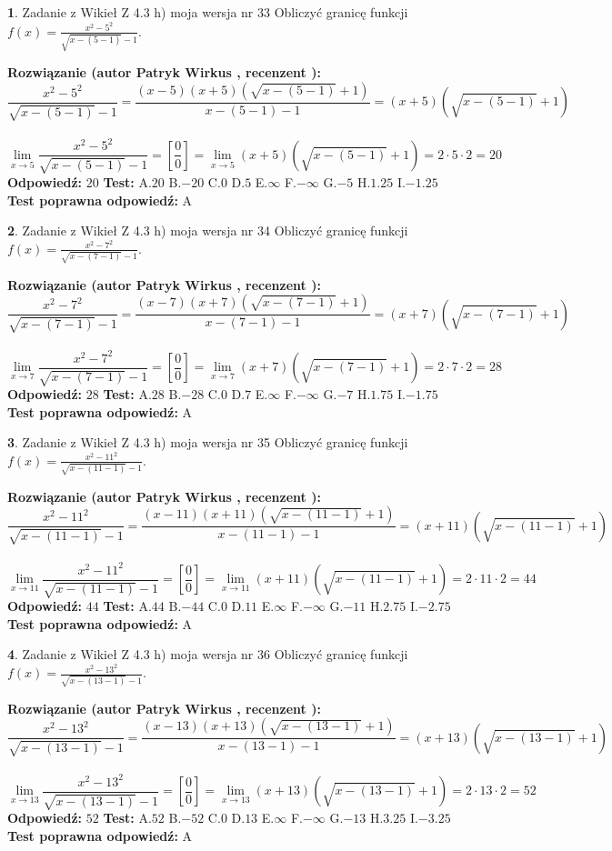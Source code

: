 \documentclass[12pt, a4paper]{article}
\theoremstyle{definition} %
\newtheorem{zad}{}
\newcommand{\zadStart}[1]{\begin{zad}#1\newline}
\newcommand{\zadStop}{\end{zad}}
\newcommand{\rozwStart}[2]{\noindent \textbf{Rozwiązanie (autor #1 , recenzent #2): }\newline}
\newcommand{\rozwStop}{\newline}
\newcommand{\odpStart}{\noindent \textbf{Odpowiedź:}\newline}
\newcommand{\odpStop}{\newline}
\newcommand{\testStart}{\noindent \textbf{Test:}\newline}
\newcommand{\testStop}{\newline}
\newcommand{\kluczStart}{\noindent \textbf{Test poprawna odpowiedź:}\newline}
\newcommand{\kluczStop}{\newline}
\begin{document}
\zadStart{Zadanie z Wikieł Z 4.3 h) moja wersja nr 33}
Obliczyć granicę funkcji $f(x)=\frac{x^{2} - 5^{2}}{\sqrt{x-(5-1)}-1}$.
\zadStop
\rozwStart{Patryk Wirkus}{}
$$\frac{x^{2} - 5^{2}}{\sqrt{x-(5-1)}-1}=\frac{(x-5)(x+5)(\sqrt{x-(5-1)}+1)}{x-(5-1)-1}=(x+5)(\sqrt{x-(5-1)}+1)$$
\\
$$\lim\limits_{x\to 5}\frac{x^{2} - 5^{2}}{\sqrt{x-(5-1)}-1}=[\frac{0}{0}]=
\lim\limits_{x\to 5}(x+5)(\sqrt{x-(5-1)}+1) = 2\cdot5 \cdot 2 = 20$$
\rozwStop
\odpStart
$20$
\odpStop
\testStart
A.$20$
B.$-20$
C.$0$
D.$5$
E.$\infty$
F.$-\infty$
G.$-5$
H.$1.25$
I.$-1.25$
\testStop
\kluczStart
A
\kluczStop



\zadStart{Zadanie z Wikieł Z 4.3 h) moja wersja nr 34}
Obliczyć granicę funkcji $f(x)=\frac{x^{2} - 7^{2}}{\sqrt{x-(7-1)}-1}$.
\zadStop
\rozwStart{Patryk Wirkus}{}
$$\frac{x^{2} - 7^{2}}{\sqrt{x-(7-1)}-1}=\frac{(x-7)(x+7)(\sqrt{x-(7-1)}+1)}{x-(7-1)-1}=(x+7)(\sqrt{x-(7-1)}+1)$$
\\
$$\lim\limits_{x\to 7}\frac{x^{2} - 7^{2}}{\sqrt{x-(7-1)}-1}=[\frac{0}{0}]=
\lim\limits_{x\to 7}(x+7)(\sqrt{x-(7-1)}+1) = 2\cdot7 \cdot 2 = 28$$
\rozwStop
\odpStart
$28$
\odpStop
\testStart
A.$28$
B.$-28$
C.$0$
D.$7$
E.$\infty$
F.$-\infty$
G.$-7$
H.$1.75$
I.$-1.75$
\testStop
\kluczStart
A
\kluczStop



\zadStart{Zadanie z Wikieł Z 4.3 h) moja wersja nr 35}
Obliczyć granicę funkcji $f(x)=\frac{x^{2} - 11^{2}}{\sqrt{x-(11-1)}-1}$.
\zadStop
\rozwStart{Patryk Wirkus}{}
$$\frac{x^{2} - 11^{2}}{\sqrt{x-(11-1)}-1}=\frac{(x-11)(x+11)(\sqrt{x-(11-1)}+1)}{x-(11-1)-1}=(x+11)(\sqrt{x-(11-1)}+1)$$
\\
$$\lim\limits_{x\to 11}\frac{x^{2} - 11^{2}}{\sqrt{x-(11-1)}-1}=[\frac{0}{0}]=
\lim\limits_{x\to 11}(x+11)(\sqrt{x-(11-1)}+1) = 2\cdot11 \cdot 2 = 44$$
\rozwStop
\odpStart
$44$
\odpStop
\testStart
A.$44$
B.$-44$
C.$0$
D.$11$
E.$\infty$
F.$-\infty$
G.$-11$
H.$2.75$
I.$-2.75$
\testStop
\kluczStart
A
\kluczStop



\zadStart{Zadanie z Wikieł Z 4.3 h) moja wersja nr 36}
Obliczyć granicę funkcji $f(x)=\frac{x^{2} - 13^{2}}{\sqrt{x-(13-1)}-1}$.
\zadStop
\rozwStart{Patryk Wirkus}{}
$$\frac{x^{2} - 13^{2}}{\sqrt{x-(13-1)}-1}=\frac{(x-13)(x+13)(\sqrt{x-(13-1)}+1)}{x-(13-1)-1}=(x+13)(\sqrt{x-(13-1)}+1)$$
\\
$$\lim\limits_{x\to 13}\frac{x^{2} - 13^{2}}{\sqrt{x-(13-1)}-1}=[\frac{0}{0}]=
\lim\limits_{x\to 13}(x+13)(\sqrt{x-(13-1)}+1) = 2\cdot13 \cdot 2 = 52$$
\rozwStop
\odpStart
$52$
\odpStop
\testStart
A.$52$
B.$-52$
C.$0$
D.$13$
E.$\infty$
F.$-\infty$
G.$-13$
H.$3.25$
I.$-3.25$
\testStop
\kluczStart
A
\kluczStop
\end{document}
